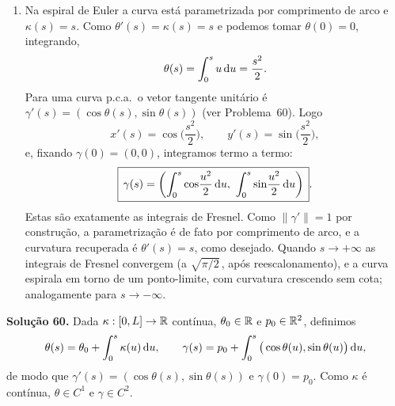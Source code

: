 \begin{enumerate}[label=(\alph*)]
\item Na espiral de Euler a curva está parametrizada por comprimento de arco e $\kappa(s)=s$. Como $\theta'(s)=\kappa(s)=s$ e podemos tomar $\theta(0)=0$, integrando,
\[
\theta(s)=\int_0^s u\,\mathrm{d} u=\frac{s^2}{2}.
\]
Para uma curva p.c.a.\ o vetor tangente unitário é $\gamma'(s)=(\cos\theta(s),\sin\theta(s))$ (ver Problema~60). Logo
\[
x'(s)=\cos\!\Big(\frac{s^2}{2}\Big),\qquad y'(s)=\sin\!\Big(\frac{s^2}{2}\Big),
\]
e, fixando $\gamma(0)=(0,0)$, integramos termo a termo:
\[
\boxed{\,\gamma(s)=\left(\int_0^s\cos\!\frac{u^2}{2}\,\mathrm{d} u,\ \int_0^s\sin\!\frac{u^2}{2}\,\mathrm{d} u\right)\,}.
\]
Estas são exatamente as integrais de Fresnel. Como $\|\gamma'\|=1$ por construção, a parametrização é de fato por comprimento de arco, e a curvatura recuperada é $\theta'(s)=s$, como desejado. Quando $s\to+\infty$ as integrais de Fresnel convergem (a $\sqrt{\pi/2}\,$, após reescalonamento), e a curva espirala em torno de um ponto-limite, com curvatura crescendo sem cota; analogamente para $s\to-\infty$.

\end{enumerate}


\bigskip\noindent\textbf{Solução 60.}\quad
Dada $\kappa:[0,L]\to\mathbb{R}$ contínua, $\theta_0\in\mathbb{R}$ e $p_0\in\mathbb{R}^2$, definimos
\[
\theta(s)=\theta_0+\int_0^s\kappa(u)\,\mathrm{d} u,\qquad
\gamma(s)=p_0+\int_0^s\big(\cos\theta(u),\sin\theta(u)\big)\,\mathrm{d} u,
\]
de modo que $\gamma'(s)=(\cos\theta(s),\sin\theta(s))$ e $\gamma(0)=p_0$. Como $\kappa$ é contínua, $\theta\in C^1$ e $\gamma\in C^2$.


